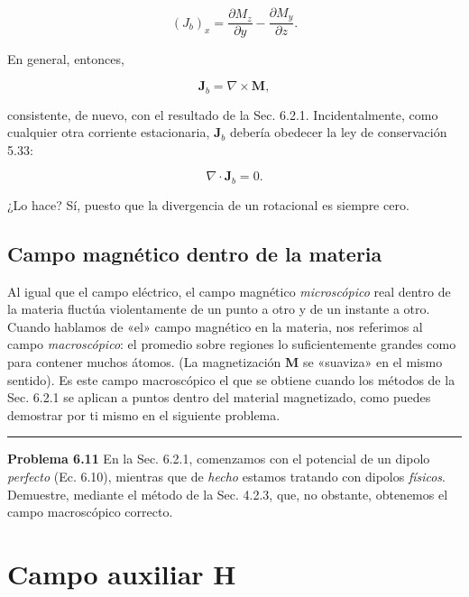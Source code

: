 \documentclass[12pt,a4paper]{report}
\newcommand{\esp}{\vspace{0.5cm}}
\begin{document}
	\begin{equation*}
		(J_b)_x = \frac{\partial M_z}{\partial y} - \frac{\partial M_y}{\partial z}.
	\end{equation*}
	
	\esp
	
	En general, entonces,
	
	\esp
	
	\begin{equation*}
		\mathbf{J}_b = \nabla \times \mathbf{M},
	\end{equation*}
	
	\esp
	
	consistente, de nuevo, con el resultado de la Sec. 6.2.1. Incidentalmente, como cualquier otra corriente estacionaria, $\mathbf{J}_b$ debería obedecer la ley de conservación 5.33:
	
	\esp
	
	\begin{equation*}
		\nabla \cdot \mathbf{J}_b = 0.
	\end{equation*}
	
	\esp
	
	¿Lo hace? Sí, puesto que la divergencia de un rotacional es siempre cero.
	
	\subsection{Campo magnético dentro de la materia}
	
	Al igual que el campo eléctrico, el campo magnético \textit{microscópico} real dentro de la materia fluctúa violentamente de un punto a otro y de un instante a otro. Cuando hablamos de «el» campo magnético en la materia, nos referimos al campo \textit{macroscópico}: el promedio sobre regiones lo suficientemente grandes como para contener muchos átomos. (La magnetización $\mathbf{M}$ se «suaviza» en el mismo sentido). Es este campo macroscópico el que se obtiene cuando los métodos de la Sec. 6.2.1 se aplican a puntos dentro del material magnetizado, como puedes demostrar por ti mismo en el siguiente problema.
	
	\esp
	\hrule
	\esp
	
	\noindent \textbf{Problema 6.11} En la Sec. 6.2.1, comenzamos con el potencial de un dipolo \textit{perfecto} (Ec. 6.10), mientras que de \textit{hecho} estamos tratando con dipolos \textit{físicos}. Demuestre, mediante el método de la Sec. 4.2.3, que, no obstante, obtenemos el campo macroscópico correcto.
	
	\section{Campo auxiliar H}
	
\end{document}
